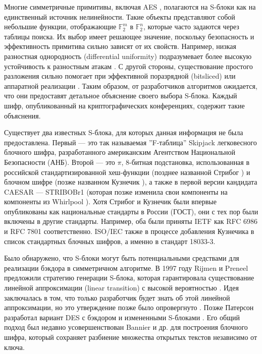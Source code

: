\introduction

Многие симметричные примитивы, включая AES \cite{AES01}, полагаются на S-блоки как на единственный источник нелинейности. Такие объекты представляют собой небольшие функции, отображающие \(\mathbb{F}_2^m\) в \(\mathbb{F}_2^n\), которые часто задаются через таблицы поиска. Их выбор имеет решающее значение, поскольку безопасность и эффективность примитива сильно зависят от их свойств. Например, низкая разностная однородность (differential uniformity) \cite{Nyb94} подразумевает более высокую устойчивость к разностным атакам \cite{BS91a, BS91b}. С другой стороны, существование простого разложения сильно помогает при эффективной поразрядной (bitsliced) или аппаратной реализации \cite{LW14, CDL16}. Таким образом, от разработчиков алгоритмов ожидается, что они предоставят детальное объяснение своего выбора S-блока. Каждый шифр, опубликованный на криптографических конференциях, содержит такие объяснения.

Существует два известных S-блока, для которых данная информация не была предоставлена. Первый — это так называемая ''F-таблица'' Skipjack \cite{US98} легковесного блочного шифра, разработанного американским Агентством Национальной Безопасности (АНБ). Второй — это \(\pi\), 8-битная подстановка, использованная в российской стандартизированной хеш-функции (позднее названной Стрибог \cite{Fed12}) и блочном шифре (позже названном Кузнечик \cite{Fed15}), а также в первой версии кандидата CAESAR — STRIBOBr1 \cite{Saa14} (которая позже изменила свои компоненты на компоненты из Whirlpool \cite{SB15}). Хотя Стрибог и Кузнечик были впервые опубликованы как национальные стандарты в России (ГОСТ), они с тех пор были включены в другие стандарты. Например, оба были приняты IETF как RFC 6986 \cite{DD13} и RFC 7801 \cite{Dol16} соответственно. ISO/IEC также в процессе добавления Кузнечика в список стандартных блочных шифров, а именно в стандарт 18033-3.

Было обнаружено, что S-блоки могут быть потенциальными средствами для реализации бэкдора в симметричном алгоритме. В 1997 году Rijmen и Preneel предложили стратегию генерации S-блока, которая гарантировала существование линейной аппроксимации (linear transition) с высокой вероятностью \cite{RP97}. Идея заключалась в том, что только разработчик будет знать об этой линейной аппроксимации, но это утверждение позже было опровергнуто \cite{WBDY98}. Позже Патерсон разработал вариант DES с бэкдором и измененными S-блоками \cite{Pat99}. Его общий подход был недавно усовершенствован Bannier и др. \cite{BBF16} для построения блочного шифра, который сохраняет разбиение множества открытых текстов независимо от ключа.

